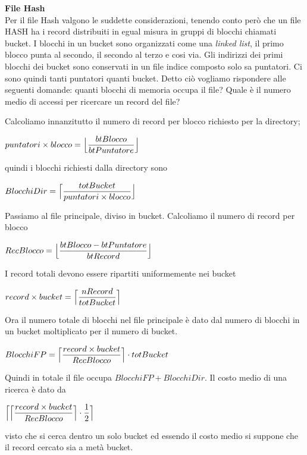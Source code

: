   \noindent\textbf{\fontsize{16pt}{1em}File Hash}\\
  Per il file Hash valgono le suddette considerazioni, tenendo conto però che un file HASH ha i record distribuiti in egual misura
  in gruppi di blocchi chiamati bucket. I blocchi in un bucket sono organizzati come una \emph{linked list}, il primo blocco punta al
  secondo, il secondo al terzo e cosi via. Gli indirizzi dei primi blocchi dei bucket sono conservati in un file indice composto solo
  sa puntatori. Ci sono quindi tanti puntatori quanti bucket. Detto ciò vogliamo rispondere alle seguenti domande: quanti blocchi di
  memoria occupa il file? Quale è il numero medio di accessi per ricercare un record del file?\\
\begin{multicols}{2}
Calcoliamo innanzitutto il numero di record per blocco richiesto per la directory; 
\begin{center}
 $puntatori \times blocco = \Bigl\lfloor \dfrac{btBlocco}{btPuntatore} \Bigr\rfloor$
\end{center}
quindi i blocchi richiesti dalla directory sono
\begin{center}
 $BlocchiDir = \Bigl\lceil \dfrac{totBucket}{puntatori \times blocco} \Bigr\rfloor$
\end{center}
Passiamo al file principale, diviso in bucket. Calcoliamo il numero di record per blocco
\begin{center}
 $RecBlocco = \Bigl\lfloor \dfrac{btBlocco-btPuntatore}{btRecord} \Bigr\rfloor$
\end{center}
I record totali devono essere ripartiti uniformemente nei bucket
\begin{center}
 $record \times bucket = \Bigl\lceil \dfrac{nRecord}{totBucket} \Bigr\rceil$
\end{center}
Ora il numero totale di blocchi nel file principale è dato dal numero di blocchi in un bucket
moltiplicato per il numero di bucket.
\begin{center}
 $BlocchiFP = \Bigl\lceil \dfrac{record \times bucket}{RecBlocco} \Bigr\rceil \cdot totBucket$
\end{center}
Quindi in totale il file occupa $BlocchiFP + BlocchiDir$. Il costo medio di 
una ricerca è dato da
\begin{center}
 $\Bigl\lceil \Bigl\lceil \dfrac{record \times bucket}{RecBlocco} \Bigr\rceil \cdot \dfrac{1}{2} \Bigr\rceil$
\end{center}
visto che si cerca dentro un solo bucket ed essendo il costo medio si suppone che il record
cercato sia a metà bucket.
\end{multicols}
  

